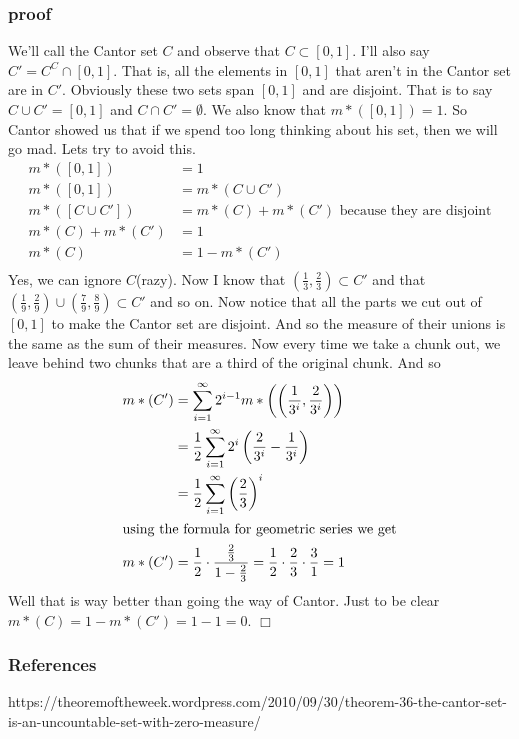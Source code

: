 \documentclass[letterpaper]{article}
\begin{document}
\begin{enumerate}
\subsubsection*{proof}
We'll call the Cantor set $C$ and observe that $C\subset [0,1]$. I'll also say $C'=C^C\cap[0,1]$. That is, all the elements in $[0,1]$ that aren't in the Cantor set are in $C'$. Obviously these two sets span $[0,1]$ and are disjoint. That is to say $C\cup C'=[0,1]$ and $C\cap C'=\emptyset$. We also know that $m*([0,1])=1$. So Cantor showed us that if we spend too long thinking about his set, then we will go mad. Lets try to avoid this.
\begin{align*}
  m*([0,1])&=1\\
  m*([0,1])&=m*(C\cup C')\\
  m*([C\cup C'])&=m*(C)+m*(C')\text{ because they are disjoint}\\
  m*(C)+m*(C')&=1\\
  m*(C)&=1-m*(C')\\
\end{align*}
Yes, we can ignore $C$(razy). 
Now I know that $(\frac{1}{3},\frac{2}{3})\subset C'$ and that $(\frac{1}{9},\frac{2}{9})\cup(\frac{7}{9},\frac{8}{9})\subset C'$ and so on. Now notice that all the parts we cut out of $[0,1]$ to make the Cantor set are disjoint. And so the measure of their unions is the same as the sum of their measures. Now every time we take a chunk out, we leave behind two chunks that are a third of the original chunk. And so
\begin{align*}
  m*(C')
  &=\sum\limits_{i=1}^\infty{2^{i-1}m*\left(\left(\frac{1}{3^i},\frac{2}{3^{i}}\right)\right)}\\
  &=\frac{1}{2}\sum\limits_{i=1}^\infty{2^{i}\left(\frac{2}{3^i}-\frac{1}{3^i}\right)}\\
  &=\frac{1}{2}\sum\limits_{i=1}^\infty{\left(\frac{2}{3}\right)^i}\\
  \intertext{using the formula for geometric series we get}
  m*(C')&=\frac{1}{2}\cdot\frac{\frac{2}{3}}{1-\frac{2}{3}}
  =\frac{1}{2}\cdot\frac{2}{3}\cdot\frac{3}{1}
  =1
\end{align*}
Well that is way better than going the way of Cantor. Just to be clear $m*(C)=1-m*(C')=1-1=0$. $\Box$
\end{enumerate}
\subsubsection*{References}
https://theoremoftheweek.wordpress.com/2010/09/30/theorem-36-the-cantor-set-is-an-uncountable-set-with-zero-measure/
\end{document}
